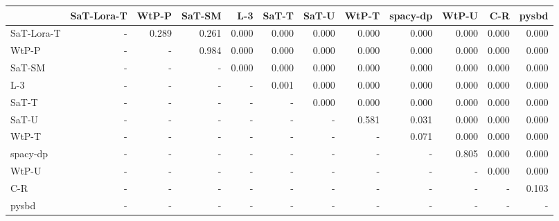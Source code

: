 \begin{tabular}{lrrrrrrrrrrr}
\toprule
 & SaT-Lora-T & WtP-P & SaT-SM & L-3 & SaT-T & SaT-U & WtP-T & spacy-dp & WtP-U & C-R & pysbd \\
\midrule
SaT-Lora-T & - & 0.289 & 0.261 & 0.000 & 0.000 & 0.000 & 0.000 & 0.000 & 0.000 & 0.000 & 0.000 \\
WtP-P & - & - & 0.984 & 0.000 & 0.000 & 0.000 & 0.000 & 0.000 & 0.000 & 0.000 & 0.000 \\
SaT-SM & - & - & - & 0.000 & 0.000 & 0.000 & 0.000 & 0.000 & 0.000 & 0.000 & 0.000 \\
L-3 & - & - & - & - & 0.001 & 0.000 & 0.000 & 0.000 & 0.000 & 0.000 & 0.000 \\
SaT-T & - & - & - & - & - & 0.000 & 0.000 & 0.000 & 0.000 & 0.000 & 0.000 \\
SaT-U & - & - & - & - & - & - & 0.581 & 0.031 & 0.000 & 0.000 & 0.000 \\
WtP-T & - & - & - & - & - & - & - & 0.071 & 0.000 & 0.000 & 0.000 \\
spacy-dp & - & - & - & - & - & - & - & - & 0.805 & 0.000 & 0.000 \\
WtP-U & - & - & - & - & - & - & - & - & - & 0.000 & 0.000 \\
C-R & - & - & - & - & - & - & - & - & - & - & 0.103 \\
pysbd & - & - & - & - & - & - & - & - & - & - & - \\
\bottomrule
\end{tabular}

